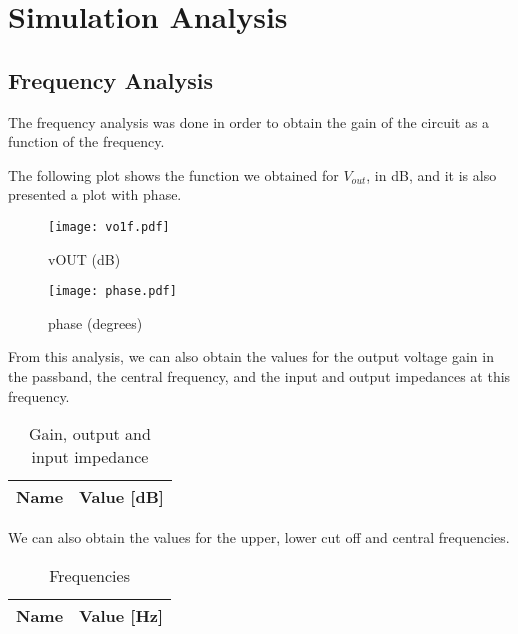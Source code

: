 \section{Simulation Analysis}
\label{sec:simulation}

\subsection{Frequency Analysis}

The frequency analysis was done in order to obtain the gain of the circuit as a function of the frequency. \par
The following plot shows the function we obtained for $V_{out}$, in dB, and it is also presented a plot with phase.

\begin{figure}[h] \centering
\texttt{[image: vo1f.pdf]}
\caption{vOUT (dB)}
\label{fig:vOUT}
\end{figure}
\FloatBarrier

\begin{figure}[h] \centering
\texttt{[image: phase.pdf]}
\caption{phase (degrees)}
\label{fig:phase}
\end{figure}
\FloatBarrier

From this analysis, we can also obtain the values for the output voltage gain in the passband, the central frequency, and the input and output impedances at this frequency.

\begin{table}[h]
  \centering
  \begin{tabular}{|l|r|}
    \hline    
    {\bf Name} & {\bf Value [dB]} \\ \hline
    
  \end{tabular}
  \caption{Gain, output and input impedance}
  \label{tab:data1sim_sim}
\end{table}
\FloatBarrier

We can also obtain the values for the upper, lower cut off and central frequencies.

 \begin{table}[h]
  \centering
  \begin{tabular}{|l|r|}
    \hline    
    {\bf Name} & {\bf Value [Hz]} \\ \hline
    
  \end{tabular}
  \caption{Frequencies}
  \label{tab:data2sim_sim}
\end{table}
\FloatBarrier

